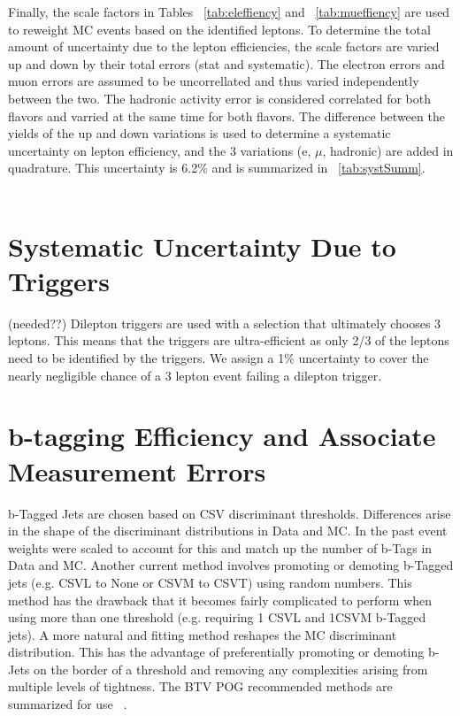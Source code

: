 Finally, the scale factors in Tables ~\ref{tab:eleffiency} and ~\ref{tab:mueffiency} are used to reweight MC events based on the identified leptons. To determine the total amount of uncertainty due to the lepton efficiencies, the scale factors are varied up and down by their total errors (stat and systematic). The electron errors and muon errors are assumed to be uncorrellated and thus varied independently between the two. The hadronic activity error is considered correlated for both flavors and varried at the same time for both flavors. The difference between the yields of the up and down variations is used to determine a systematic uncertainty on lepton efficiency, and the 3 variations (e, $\mu$, hadronic) are added in quadrature. This uncertainty is 6.2\% and is summarized in ~\ref{tab:systSumm}.\\\\





\section{Systematic Uncertainty Due to Triggers}         (needed??)
\label{sec:trigger_syst}
Dilepton triggers are used with a selection that ultimately chooses 3 leptons. This means that the triggers are ultra-efficient as only 2/3 of the leptons need to be identified by the triggers. We assign a 1\% uncertainty to cover the nearly negligible chance of a 3 lepton event failing a dilepton trigger.

\section{b-tagging Efficiency and Associate Measurement Errors}
\label{sec:btag_syst}
b-Tagged Jets are chosen based on CSV discriminant thresholds. Differences arise in the shape of the discriminant distributions in Data and MC. In the past event weights were scaled to account for this and match up the number of b-Tags in Data and MC. Another current method involves promoting or demoting b-Tagged jets (e.g. CSVL to None or CSVM to CSVT) using random numbers. This method has the drawback that it becomes fairly complicated to perform when using more than one threshold (e.g. requiring 1 CSVL and 1CSVM b-Tagged jets). A more natural and fitting method reshapes the MC discriminant distribution. This has the advantage of preferentially promoting or demoting b-Jets on the border of a threshold and removing any complexities arising from multiple levels of tightness. The BTV POG recommended methods are summarized for use ~\cite{bTagSF}.\\

